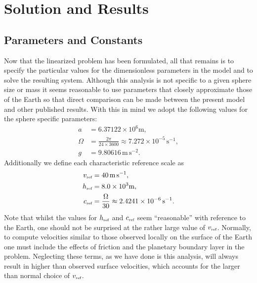 \section{Solution and Results}
\subsection{Parameters and Constants}
Now that the linearized problem has been formulated, all that remains is to specify the particular values for the dimensionless parameters in the model and to solve the resulting system. Although this analysis is not specific to a given sphere size or mass it seems reasonable to use parameters that closely approximate those of the Earth so that direct comparison can be made between the present model and other published results. With this in mind we adopt the following values for the sphere specific parameters:
\begin{align}
a&=6.37122\times10^6\text{m},\\
\Omega&=\frac{2 \pi}{24\times3600}\approx7.272\times10^{-5}\,\text{s}^{-1},\\
g&=9.80616\,\text{m}\,\text{s}^{-2}.
\end{align}
Additionally we define each characteristic reference scale as
\begin{align}
v_{\mbox{\tiny ref}}&=40\,\text{m}\,\text{s}^{-1},\\
h_{\mbox{\tiny ref}}&=8.0\times10^{3}\text{m},\\
c_{\mbox{\tiny ref}}&=\frac{\Omega}{30}\approx2.4241\times10^{-6}\,\text{s}^{-1}.
\end{align}
Note that whilst the values for $h_{\mbox{\tiny ref}}$ and $c_{\mbox{\tiny ref}}$ seem ``reasonable'' with reference to the Earth, one should not be surprised at the rather large value of $v_{\mbox{\tiny ref}}$. Normally, to compute velocities similar to those observed locally on the surface of the Earth one must include the effects of friction and the planetary boundary layer in the problem. Neglecting these terms, as we have done is this analysis,  will always result in higher than observed surface velocities, which accounts for the larger than normal choice of $v_{\mbox{\tiny ref}}$.

